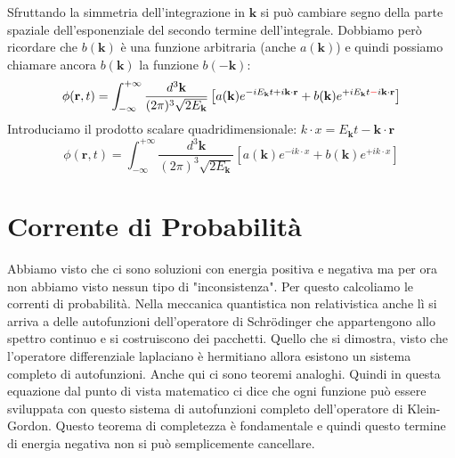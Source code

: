 Sfruttando la simmetria dell'integrazione in $\mathbf{k}$ si può cambiare segno della parte spaziale dell'esponenziale del secondo termine dell'integrale. Dobbiamo però ricordare che $b(\mathbf{k})$ è una funzione arbitraria (anche $a(\mathbf{k})$) e quindi possiamo chiamare ancora $b(\mathbf{k})$ la funzione $b(-\mathbf{k})$:
\begin{equation}
    \phi(\mathbf{r}, t)=\int_{-\infty}^{+\infty} \frac{d^3 \mathbf{k}}{(2 \pi)^3 \sqrt{2 E_{\mathbf{k}}}}\left[a(\mathbf{k}) e^{-i E_{\mathbf{k}} t+i \mathbf{k} \cdot \mathbf{r}}+b(\mathbf{k}) e^{+i E_{\mathbf{k}} t\textcolor{red}{-}i \mathbf{k} \cdot \mathbf{r}}\right]
\end{equation}
Introduciamo il prodotto scalare quadridimensionale: $k\cdot x=E_\mathbf{k}t-\mathbf{k}\cdot\mathbf{r}$
\begin{equation}
    \phi(\mathbf{r}, t)=\int_{-\infty}^{+\infty} \frac{d^3 \mathbf{k}}{(2 \pi)^3 \sqrt{2 E_{\mathbf{k}}}}\left[a(\mathbf{k}) e^{-ik\cdot x}+b(\mathbf{k}) e^{+i k\cdot x}\right]
\end{equation}
\section{Corrente di Probabilità}
Abbiamo visto che ci sono soluzioni con energia positiva e negativa ma per ora non abbiamo visto nessun tipo di "inconsistenza". Per questo calcoliamo le correnti di probabilità. Nella meccanica quantistica non relativistica anche lì si arriva a delle autofunzioni dell'operatore di Schr\"odinger che appartengono allo spettro continuo e si costruiscono dei pacchetti. Quello che si dimostra, visto che l'operatore differenziale laplaciano è hermitiano allora esistono un sistema completo di autofunzioni. Anche qui ci sono teoremi analoghi. Quindi in questa equazione dal punto di vista matematico ci dice che ogni funzione può essere sviluppata con questo sistema di autofunzioni completo dell'operatore di Klein-Gordon. Questo teorema di completezza è fondamentale e quindi questo termine di energia negativa non si può semplicemente cancellare.

